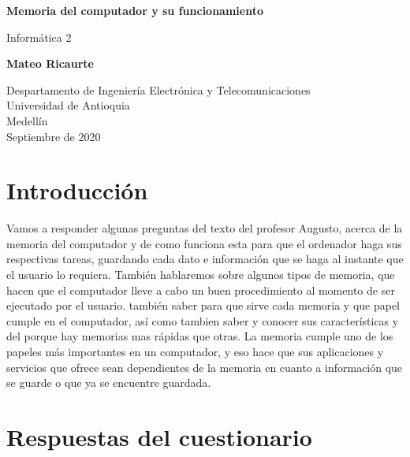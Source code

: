 \documentclass{article}
\begin{document}
\begin{titlepage}
    \begin{center}
        \vspace*{1cm}
            
        \Huge
        \textbf{Memoria del computador y su funcionamiento}
            
        \vspace{0.5cm}
        \LARGE
        Informática 2
            
        \vspace{1.5cm}
            
        \textbf{Mateo Ricaurte}
            
        \vfill
            
        \vspace{0.8cm}
            
        \Large
        Despartamento de Ingeniería Electrónica y Telecomunicaciones\\
        Universidad de Antioquia\\
        Medellín\\
        Septiembre de 2020
            
    \end{center}
\end{titlepage}

\tableofcontents
\newpage
\section{Introducción}
Vamos a responder algunas preguntas del texto del profesor Augusto, acerca de la memoria del computador y de como funciona esta para que el ordenador haga sus respectivas tareas, guardando cada dato e información que se haga al instante que el usuario lo requiera. También hablaremos sobre algunos tipos de memoria, que hacen que el computador lleve a cabo un buen procedimiento al momento de ser ejecutado por el usuario. también saber para que sirve cada memoria y que papel cumple en el computador, así como tambien saber y conocer sus características y del porque hay memorias mas rápidas que otras. La memoria cumple uno de los papeles más importantes en un computador, y eso hace que sus aplicaciones y servicios que ofrece sean dependientes de la memoria en cuanto a información que se guarde o que ya se encuentre guardada.

\section{Respuestas del cuestionario} \label{contenido}
\end{document}
